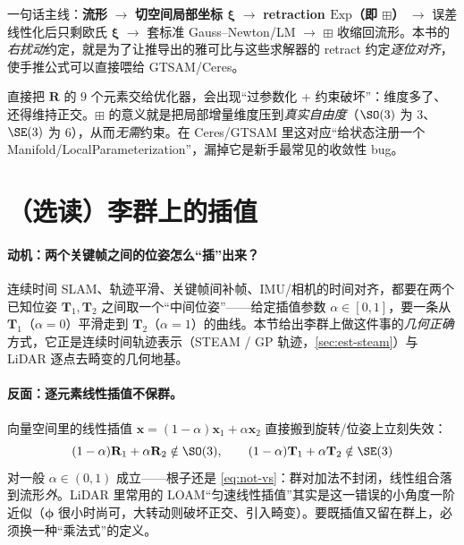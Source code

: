 \begin{insight}
一句话主线：\textbf{流形} $\to$ \textbf{切空间局部坐标 $\boldsymbol{\xi}$} $\to$ \textbf{retraction $\mathrm{Exp}$（即 $\boxplus$）} $\to$ 误差线性化后只剩欧氏 $\boldsymbol{\xi}$ $\to$ 套标准 Gauss–Newton/LM $\to$ $\boxplus$ 收缩回流形。本书的\emph{右扰动}约定，就是为了让推导出的雅可比与这些求解器的 retract 约定\emph{逐位对齐}，使手推公式可以直接喂给 GTSAM/Ceres。
\end{insight}

\begin{pitfall}
直接把 $\mathbf{R}$ 的 $9$ 个元素交给优化器，会出现“过参数化 + 约束破坏”：维度多了、还得维持正交。$\boxplus$ 的意义就是把局部增量维度压到\emph{真实自由度}（$\SO(3)$ 为 $3$、$\SE(3)$ 为 $6$），从而\emph{无需}约束。在 Ceres/GTSAM 里这对应“给状态注册一个 Manifold/LocalParameterization”，漏掉它是新手最常见的收敛性 bug。
\end{pitfall}

\section{（选读）李群上的插值}
\label{sec:lie-interp}

\paragraph{动机：两个关键帧之间的位姿怎么“插”出来？}
连续时间 SLAM、轨迹平滑、关键帧间补帧、IMU/相机的时间对齐，都要在两个已知位姿 $\mathbf{T}_1,\mathbf{T}_2$ 之间取一个“中间位姿”——给定插值参数 $\alpha\in[0,1]$，要一条从 $\mathbf{T}_1$（$\alpha{=}0$）平滑走到 $\mathbf{T}_2$（$\alpha{=}1$）的曲线。本节给出李群上做这件事的\emph{几何正确}方式，它正是连续时间轨迹表示（STEAM / GP 轨迹，\cref{sec:est-steam}）与 LiDAR 逐点去畸变的几何地基。

\paragraph{反面：逐元素线性插值不保群。}
向量空间里的线性插值 $\mathbf{x}=(1-\alpha)\mathbf{x}_1+\alpha\mathbf{x}_2$ 直接搬到旋转/位姿上立刻失效\cite{barfoot2024state}：
\begin{equation}
  (1-\alpha)\mathbf{R}_1+\alpha\mathbf{R}_2\notin\SO(3),\qquad
  (1-\alpha)\mathbf{T}_1+\alpha\mathbf{T}_2\notin\SE(3)
  \label{eq:interp-linear-fail}
\end{equation}
对一般 $\alpha\in(0,1)$ 成立——根子还是 \cref{eq:not-vs}：群对加法不封闭，线性组合落到流形\emph{外}。LiDAR 里常用的 LOAM“匀速线性插值”其实是这一错误的小角度一阶近似（$\boldsymbol{\phi}$ 很小时尚可，大转动则破坏正交、引入畸变）。要既插值又留在群上，必须换一种“乘法式”的定义。

